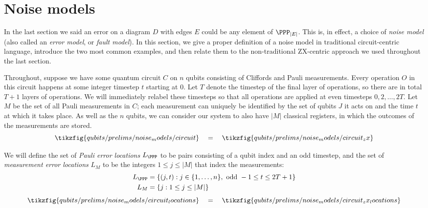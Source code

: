 \chapter{Noise models}

In the last section we said an error on a diagram $D$ with edges $E$ could be any element of $\PPP_{|E|}$.
This is, in effect, a choice of \textit{noise model} (also called an \textit{error model}, or \textit{fault model}).
In this section, we give a proper definition of a noise model in traditional circuit-centric language, introduce the two most common examples, and then relate them to the non-traditional ZX-centric approach we used throughout the last section.

Throughout, suppose we have some quantum circuit $C$ on $n$ qubits consisting of Cliffords and Pauli measurements.
Every operation $O$ in this circuit happens at some integer timestep $t$ starting at $0$.
Let $T$ denote the timestep of the final layer of operations, so there are in total $T+1$ layers of operations.
We will immediately relabel these timesteps so that all operations are applied at even timesteps $0, 2, \ldots, 2T$.
Let $M$ be the set of all Pauli measurements in $C$; each measurement can uniquely be identified by the set of qubits $J$ it acts on and the time $t$ at which it takes place.
As well as the $n$ qubits, we can consider our system to also have $|M|$ classical registers, in which the outcomes of the measurements are stored.
\begin{equation}
    \tikzfig{qubits/prelims/noise_models/circuit}
    \quad = \quad
    \tikzfig{qubits/prelims/noise_models/circuit_zx}
\end{equation}

We will define the set of \textit{Pauli error locations} $L_\PPP$ to be pairs consisting of a qubit index and an odd timestep, and the set of \textit{measurement error locations} $L_M$ to be the integers $1 \leq j \leq |M|$ that index the measurements:
\begin{equation}\label{eq:pauli_and_measurement_error_locations}
    \begin{aligned}
        L_\PPP &= \{(j, t) : j \in \{1, \ldots, n\}, \text{ odd } -1 \leq t \leq 2T+1\} \\
        L_M &= \{j : 1 \leq j \leq |M|\}
    \end{aligned}
\end{equation}
\begin{equation}
    \tikzfig{qubits/prelims/noise_models/circuit_locations}
    \quad = \quad
    \tikzfig{qubits/prelims/noise_models/circuit_zx_locations}
\end{equation}


